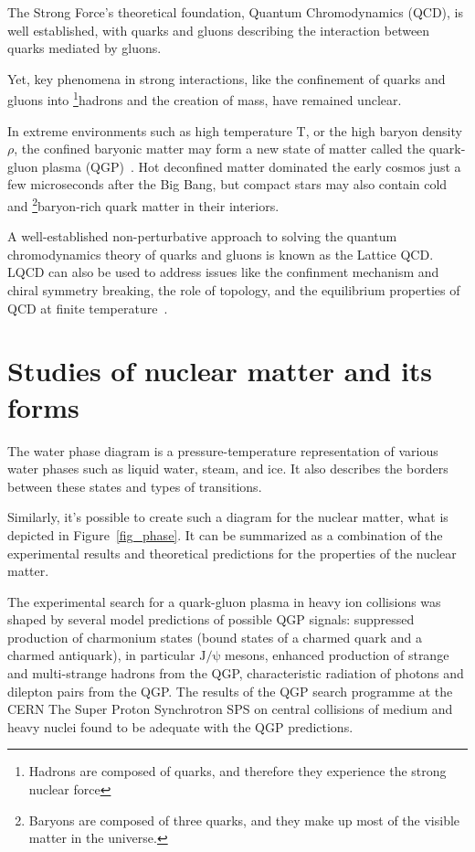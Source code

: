 The Strong Force's theoretical foundation, Quantum Chromodynamics (QCD), is well established, with quarks and gluons describing the interaction between quarks mediated by gluons.

Yet, key phenomena in strong interactions, like the confinement of quarks and gluons into \footnote{Hadrons are composed of quarks, and therefore they experience the strong nuclear force}{hadrons} and the creation of mass, have remained unclear.

In extreme environments such as high temperature T, or the high baryon density $\rho$, the confined baryonic matter may form a new state of matter called the quark-gluon plasma (\gls{QGP})~\cite{phase_diagram}. Hot deconfined matter dominated the early cosmos just a few microseconds after the Big Bang, but compact stars may also contain cold and \footnote{Baryons are composed of three quarks, and they make up most of the visible matter in the universe.}{baryon}-rich quark matter in their interiors.

A well-established non-perturbative approach to solving the quantum chromodynamics theory of quarks and gluons is known as the Lattice \gls{QCD}. LQCD can also be used to address issues like the confinment mechanism and chiral symmetry breaking, the role of topology, and the equilibrium properties of \gls{QCD} at finite temperature~\cite{lattice_qcd}. 

\section{Studies of nuclear matter and its forms}
The water phase diagram is a pressure-temperature representation of various water phases such as liquid water, steam, and ice. It also describes the borders between these states and types of transitions. 

Similarly, it's possible to create such a diagram for the nuclear matter, what is depicted in Figure~\ref{fig_phase}. It can be summarized as a combination of the experimental results and theoretical predictions for the properties of the nuclear matter.

The experimental search for a quark-gluon plasma in heavy ion
collisions was shaped by several model predictions of possible \gls{QGP} signals: suppressed production of charmonium states (bound states of a charmed quark and a charmed antiquark), in particular $\mathrm{J/\psi}$ mesons, enhanced production of strange and multi-strange hadrons from the \gls{QGP}, characteristic radiation of photons and dilepton pairs from the \gls{QGP}. The results of the QGP search programme at the \gls{CERN} The Super Proton Synchrotron \gls{SPS} on central collisions of medium and heavy nuclei found to be adequate with the QGP predictions.

